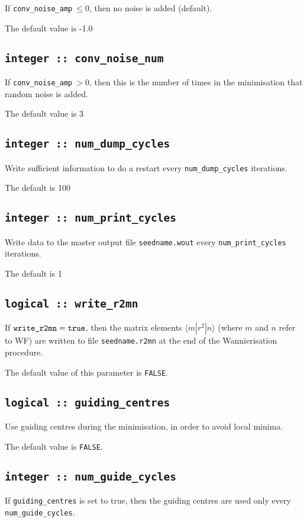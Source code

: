 If {\tt conv\_noise\_amp}$\:\leq 0$, then no noise is added (default).

The default value is -1.0

\subsection[conv\_noise\_num]{\tt integer :: conv\_noise\_num}

If {\tt conv\_noise\_amp}$\:>0$, then this is the number of times in the
minimisation that random noise is added.

The default value is 3

\subsection[num\_dump\_cycles]{\tt integer :: num\_dump\_cycles}
Write sufficient information to do a restart every
\verb#num_dump_cycles# iterations.

The default is 100

\subsection[num\_print\_cycles]{\tt integer :: num\_print\_cycles}
Write data to the master output file {\tt seedname.wout} every
\verb#num_print_cycles# iterations.

The default is 1

\subsection[write\_r2mn]{\tt logical :: write\_r2mn}

If $\verb#write_r2mn#=\verb#true#$, then the matrix elements
$\langle m|r^2|n\rangle$ (where $m$ and $n$ refer to WF) are written 
to file \verb#seedname.r2mn# at the end of the Wannierisation
procedure. 

The default value of this parameter is \verb#FALSE#.


\subsection[guiding\_centres]{\tt logical :: guiding\_centres}
Use guiding centres during the minimisation, in order to avoid
local minima.

The default value is \verb#FALSE#.

\subsection[num\_guide\_cycles]{\tt integer :: num\_guide\_cycles}
If \verb#guiding_centres# is set to true, then the
guiding centres are used only every \verb#num_guide_cycles#.

